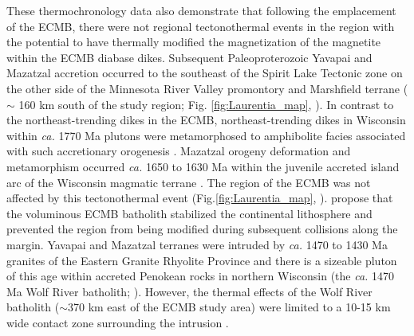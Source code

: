 \documentclass[draft]{agujournal2019}
\begin{document}
These thermochronology data also demonstrate that following the emplacement of the ECMB, there were not regional tectonothermal events in the region with the potential to have thermally modified the magnetization of the magnetite within the ECMB diabase dikes. Subsequent Paleoproterozoic Yavapai and Mazatzal accretion occurred to the southeast of the Spirit Lake Tectonic zone on the other side of the Minnesota River Valley promontory and Marshfield terrane ($\sim$ 160 km south of the study region; Fig. \ref{fig:Laurentia_map}, ). In contrast to the northeast-trending dikes in the ECMB, northeast-trending dikes in Wisconsin within \textit{ca.} 1770 Ma plutons were metamorphosed to amphibolite facies associated with such accretionary orogenesis \cite{Holm1998b}. Mazatzal orogeny deformation and metamorphism occurred \textit{ca.} 1650 to 1630 Ma within the juvenile accreted island arc of the Wisconsin magmatic terrane \cite{Holm1998c}. The region of the ECMB was not affected by this tectonothermal event (Fig.\ref{fig:Laurentia_map}, ).  propose that the voluminous ECMB batholith stabilized the continental lithosphere and prevented the region from being modified during subsequent collisions along the margin. Yavapai and Mazatzal terranes were intruded by \textit{ca.} 1470 to 1430 Ma granites of the Eastern Granite Rhyolite Province and there is a sizeable pluton of this age within accreted Penokean rocks in northern Wisconsin (the \textit{ca.} 1470 Ma Wolf River batholith; ). However, the thermal effects of the Wolf River batholith ($\sim$370 km east of the ECMB study area) were limited to a 10-15 km wide contact zone surrounding the intrusion \cite{Holm2019a}. 
\end{document}

